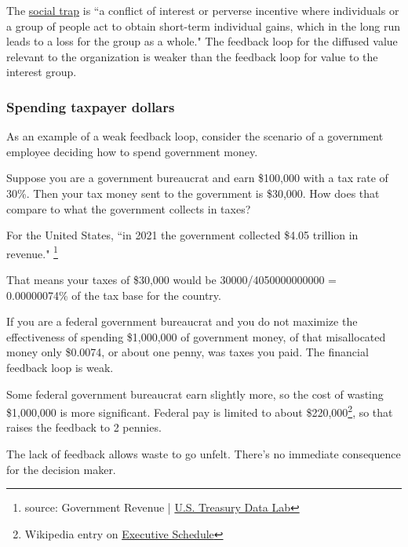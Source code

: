 The \href{https://en.wikipedia.org/wiki/Social_trap}{social trap}
is ``a conflict of interest or perverse incentive where individuals or a group of people act to obtain short-term individual gains, which in the long run leads to a loss for the group as a whole."
The feedback loop for the diffused value relevant to the organization is weaker than the feedback loop for value to the interest group. 

\subsubsection*{Spending taxpayer dollars}

As an example of a weak feedback loop, consider the scenario of a government employee deciding how to spend government money.

\begin{mdframed}
Suppose you are a government bureaucrat and earn \$100,000 with a tax rate of 30\%. Then your tax money sent to the government is \$30,000.
How does that compare to what the government collects in taxes?

For the United States, ``in 2021 the government collected \$4.05 trillion in revenue."
\footnote{source: Government Revenue | \href{https://datalab.usaspending.gov/americas-finance-guide/revenue/}{U.S. Treasury Data Lab}}

That means your taxes of \$30,000 would be
30000/4050000000000 = 0.00000074\% of the tax base for the country.

If you are a federal government bureaucrat and you do not maximize the effectiveness of spending \$1,000,000 of government money, of that misallocated money only \$0.0074, or about one penny, was taxes you paid. The financial feedback loop is weak.

Some federal government bureaucrat earn slightly more, so the cost of wasting \$1,000,000 is more significant.
Federal pay is limited to about \$220,000\footnote{Wikipedia entry on \href{https://en.wikipedia.org/wiki/Executive\_Schedule}{Executive Schedule}
}, so that raises the feedback to 2 pennies.
\end{mdframed}

The lack of feedback allows waste to go unfelt. There's no immediate consequence for the decision maker.

